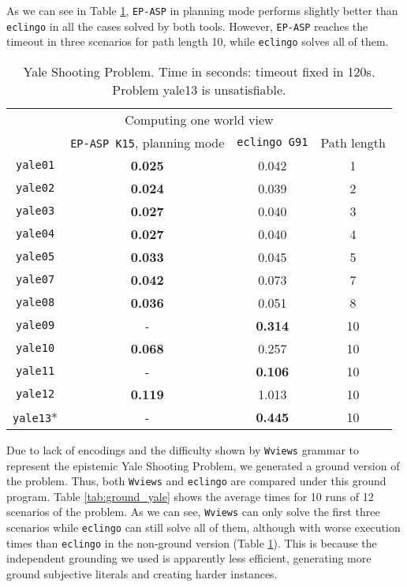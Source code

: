 \documentclass{new_tlp}
\def\eclingo{{\tt eclingo}}
\def\wviews{{\tt Wviews}}
\def\wviews{{\tt Wviews}}
\def\EPASP{{\tt EP-ASP}}
\begin{document}
As we can see in Table \ref{tab:yale}, \EPASP{} in planning mode performs slightly better than \eclingo{} in all the cases solved by both tools. However, \EPASP{} reaches the timeout in three scenarios for path length 10, while \eclingo{} solves all of them.
\begin{table}[ht]
    \begin{tabular}{c|cc|c}
\cline{1-4}
\multicolumn{4}{c}{Computing one world view}         \\ \cline{1-4}
           & \texttt{EP-ASP K15}, planning mode & \texttt{eclingo G91} & Path length \\ \cline{1-4}
\texttt{yale01}  & \textbf{0.025}    & 0.042       & 1           \\
\texttt{yale02}  & \textbf{0.024}    & 0.039       & 2           \\
\texttt{yale03}  & \textbf{0.027}    & 0.040       & 3           \\
\texttt{yale04}  & \textbf{0.027}    & 0.040       & 4           \\
\texttt{yale05}  & \textbf{0.033}    & 0.045       & 5           \\
\texttt{yale07}  & \textbf{0.042}    & 0.073       & 7           \\
\texttt{yale08}  & \textbf{0.036}   & 0.051       & 8           \\
\texttt{yale09}  & -                 & \textbf{0.314}       & 10          \\
\texttt{yale10}  & \textbf{0.068}   & 0.257       & 10          \\
\texttt{yale11}  & -                 & \textbf{0.106}       & 10          \\
\texttt{yale12}  & \textbf{0.119}    & 1.013       & 10          \\
\texttt{yale13}* & -                 & \textbf{0.445}       & 10          \\ \cline{1-4}
\end{tabular}
\setlength{\abovecaptionskip}{5pt}
\caption{Yale Shooting Problem. Time in seconds: timeout fixed in 120s. Problem yale13 is unsatisfiable.}
\label{tab:yale}
\end{table}

Due to lack of encodings and the difficulty shown by \wviews{} grammar to represent the epistemic Yale Shooting Problem, we generated a ground version of the problem. Thus, both \wviews{} and \eclingo{} are compared under this ground program. Table \ref{tab:ground_yale} shows the average times for 10 runs of 12 scenarios of the problem. As we can see, \wviews{} can only solve the first three scenarios while \eclingo{} can still solve all of them, although with worse execution times than \eclingo{} in the non-ground version (Table \ref{tab:yale}).
This is because the independent grounding we used is apparently less efficient, generating more ground subjective literals and creating harder instances.
\end{document}
